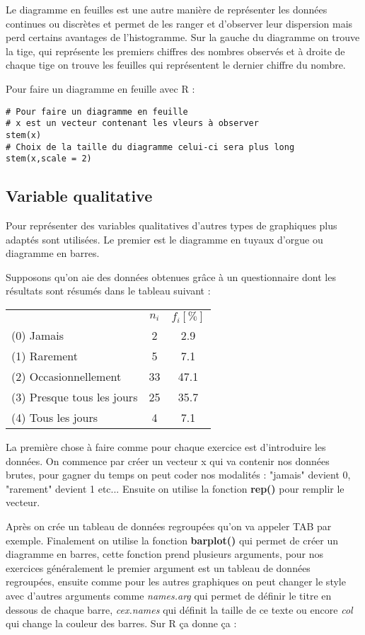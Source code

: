 \documentclass{report}
\begin{document}
Le diagramme en feuilles est une autre manière de représenter les données continues ou discrètes et permet de les ranger et d'observer leur dispersion mais perd certains avantages de l'histogramme. Sur la gauche du diagramme on trouve la tige, qui représente les premiers chiffres des nombres observés et à droite de chaque tige on trouve les feuilles qui représentent le dernier chiffre du nombre.

Pour faire un diagramme en feuille avec R :
\begin{verbatim}
# Pour faire un diagramme en feuille
# x est un vecteur contenant les vleurs à observer
stem(x)
# Choix de la taille du diagramme celui-ci sera plus long
stem(x,scale = 2)  
\end{verbatim}

\subsection{Variable qualitative}

Pour représenter des variables qualitatives d'autres types de graphiques plus adaptés sont utilisées. Le premier est le diagramme en tuyaux d'orgue ou diagramme en barres.

Supposons qu'on aie des données obtenues grâce à un questionnaire dont les résultats sont résumés dans le tableau suivant :

\quad
\begin{center}
\begin{tabular}{l c c} 
\hline
  &$n_i$& $f_i [\%] $\\ \cline{2-3}
(0) Jamais & 2 & 2.9  \\
(1) Rarement & 5 & 7.1  \\
(2) Occasionnellement & 33 & 47.1  \\
(3) Presque tous les jours & 25 & 35.7  \\
(4) Tous les jours & 4 & 7.1  \\
\hline
\end{tabular}
\end{center}
\quad

La première chose à faire comme pour chaque exercice est d'introduire les données. On commence par créer un vecteur x qui va contenir nos données brutes, pour gagner du temps on peut coder nos modalités : "jamais" devient 0, "rarement" devient 1 etc... Ensuite on utilise la fonction \textbf{rep()} pour remplir le vecteur.

Après on crée un tableau de données regroupées qu'on va appeler TAB par exemple.
Finalement on utilise la fonction \textbf{barplot()} qui permet de créer un diagramme en barres, cette fonction prend plusieurs arguments, pour nos exercices généralement le premier argument est un tableau de données regroupées, ensuite comme pour les autres graphiques on peut changer le style avec d'autres arguments comme \textit{names.arg} qui permet de définir le titre en dessous de chaque barre, \textit{cex.names} qui définit la taille de ce texte ou encore \textit{col} qui change la couleur des barres. Sur R ça donne ça :
\end{document}

